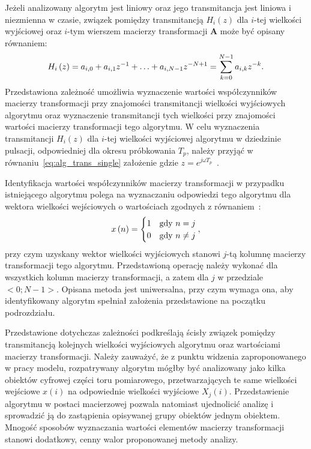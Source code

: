 Jeżeli analizowany algorytm jest liniowy oraz jego transmitancja jest liniowa i niezmienna w czasie, związek pomiędzy transmitancją $H_{i}(z)$ dla $i$-tej wielkości wyjściowej oraz $i$-tym wierszem macierzy transformacji $\mathbf{A}$ może być opisany równaniem:
\begin{equation}
H_{i} \left(z\right) = a_{i, 0} + a_{i, 1} z^{-1} + \hdots + a_{i, N-1} z^{-N+1} = \sum _{k = 0} ^{N-1} a_{i, k} z^{-k} \label{eq:alg_trans_single}.
\end{equation}
Przedstawiona zależność umożliwia wyznaczenie wartości współczynników macierzy transformacji przy znajomości transmitancji wielkości wyjściowych algorytmu oraz wyznaczenie transmitancji tych wielkości przy znajomości wartości macierzy transformacji tego algorytmu. W celu wyznaczenia transmitancji $H_{i}(z)$ dla $i$-tej wielkości wyjściowej algorytmu w dziedzinie pulsacji, odpowiedniej dla okresu próbkowania $T_{p}$, należy przyjąć w równaniu~\eqref{eq:alg_trans_single} założenie gdzie $z = e^{j\omega T_{p}}$~\cite{proakis_dsp}.

Identyfikacja wartości współczynników macierzy transformacji w przypadku istniejącego algorytmu polega na wyznaczaniu odpowiedzi tego algorytmu dla wektora wielkości wejściowych o wartościach zgodnych z równaniem~\cite{jakubiec_algorithms, jakubiec_system}:
\begin{equation}
x \emb{n} =
\begin{cases}
	1 & $gdy$~n = j \\
	0 & $gdy$~n \neq j
\end{cases}
\label{eq:wt_ident},
\end{equation}
przy czym uzyskany wektor wielkości wyjściowych stanowi $j$-tą kolumnę macierzy transformacji tego algorytmu. Przedstawioną operację należy wykonać dla wszystkich kolumn macierzy transformacji, a zatem dla $j$ w przedziale $<0;N-1>$. Opisana metoda jest uniwersalna, przy czym wymaga ona, aby identyfikowany algorytm spełniał założenia przedstawione na początku podrozdziału.

Przedstawione dotychczas zależności podkreślają ścisły związek pomiędzy transmitancją kolejnych wielkości wyjściowych algorytmu oraz wartościami macierzy transformacji. Należy zauważyć, że z punktu widzenia zaproponowanego w pracy modelu, rozpatrywany algorytm mógłby być analizowany jako kilka obiektów cyfrowej części toru pomiarowego, przetwarzających te same wielkości wejściowe $x(i)$ na odpowiednie wielkości wyjściowe $X_{j}(i)$. Przedstawienie algorytmu w postaci macierzowej pozwala natomiast ujednolicić analizę i sprowadzić ją do zastąpienia opisywanej grupy obiektów jednym obiektem. Mnogość sposobów wyznaczania wartości elementów macierzy transformacji stanowi dodatkowy, cenny walor proponowanej metody analizy.

